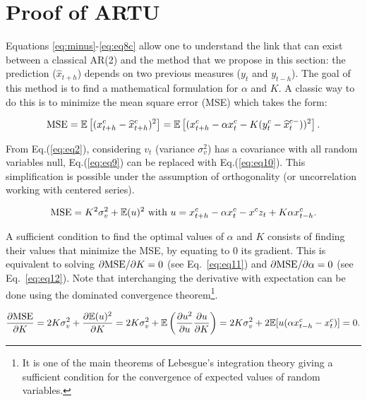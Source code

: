 \documentclass[preprint,12pt,3p]{elsarticle}
\begin{document}
 \section{Proof of ARTU}
 \label{proof}
Equations \ref{eq:minus}-\ref{eq:eq8c} allow one to understand the link that can exist between a classical AR(2) and the method that we propose in this section: the prediction ($\widehat{x}_{t+h}$) depends on two previous measures ($y_t$ and $y_{t-h}$). The goal of this method is to find a mathematical formulation for $\alpha$ and $K$. A classic way to do this is to minimize the mean square error (MSE) which takes the form:

\begin{equation}
\label{eq:eq9}
\textnormal{MSE}=\mathbb{E}\left[(x^c_{t+h}-\widehat{x}^c_{t+h})^2\right]=\mathbb{E}\left[(x^c_{t+h}-\alpha x^c_t-K(y^c_t-\widehat{x}^{c -}_{t}))^2\right].
\end{equation}

From Eq.(\ref{eq:eq2}), considering $v_t$ (variance $\sigma^2_{v}$) has a covariance with all random variables null, Eq.(\ref{eq:eq9}) can be replaced with Eq.(\ref{eq:eq10}). This simplification is possible under the assumption of orthogonality (or uncorrelation working with centered series). 

\begin{equation}
\label{eq:eq10}
\textnormal{MSE}=K^2\sigma^2_{v}+\mathbb{E}(u)^2 ~\textnormal{with} ~u=x^c_{t+h}-\alpha x^c_t-x^cz_t+K\alpha x^c_{t-h}.
\end{equation}

A sufficient condition to find the optimal values of $\alpha$ and $K$ consists of finding their values that minimize the MSE, by equating to 0 its gradient. This is equivalent to solving $\partial \textnormal{MSE}/\partial K=0$ (see Eq.~\ref{eq:eq11}) and $\partial \textnormal{MSE}/\partial \alpha=0$ (see Eq.~\ref{eq:eq12}). Note that interchanging the derivative with expectation can be done using the dominated convergence theorem\footnote{It is one of the main theorems of Lebesgue's integration theory giving a sufficient condition for the convergence of expected values of random variables.}.

\begin{equation}
\label{eq:eq11}
\frac{\partial \textnormal{MSE}}{\partial K}=2K\sigma^2_{v}+\frac{\partial \mathbb{E}(u)^2}{\partial K}=2K\sigma^2_{v}+\mathbb{E}\left(\frac{\partial u^2}{\partial u}\frac{\partial u}{\partial K}\right)=2K\sigma^2_{v}+2\mathbb{E}[u(\alpha x^c_{t-h}-x^c_t)]=0.
\end{equation}
\end{document}
